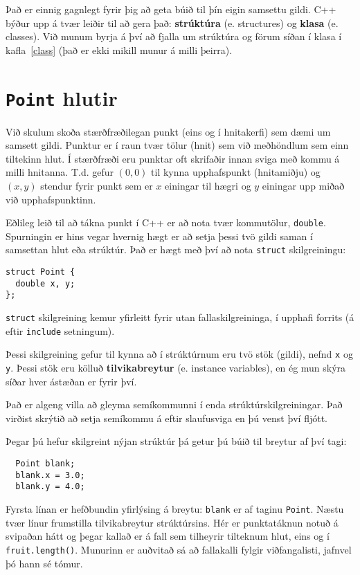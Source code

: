 Það er einnig gagnlegt fyrir þig að geta búið til þín eigin samsettu gildi.
C++ býður upp á tvær leiðir til að gera það: {\bf strúktúra} (e. structures) og {\bf klasa} (e. classes).
Við munum byrja á því að fjalla um strúktúra og förum síðan í klasa í kafla~\ref{class} (það er ekki mikill munur á milli þeirra).

\section{{\tt Point} hlutir}

Við skulum skoða stærðfræðilegan punkt (eins og í hnitakerfi) sem dæmi um samsett gildi.
Punktur er í raun tvær tölur (hnit) sem við meðhöndlum sem einn tiltekinn hlut.
Í stærðfræði eru punktar oft skrifaðir innan sviga með kommu á milli hnitanna.
T.d. gefur $(0, 0)$ til kynna upphafspunkt (hnitamiðju) og $(x, y)$ stendur fyrir punkt sem er $x$ einingar til hægri og $y$ einingar upp miðað við upphafspunktinn.

Eðlileg leið til að tákna punkt í C++ er að nota tvær kommutölur, {\tt double}.
Spurningin er hins vegar hvernig hægt er að setja þessi tvö gildi saman í samsettan hlut eða strúktúr.
Það er hægt með því að nota {\tt struct} skilgreiningu:

\begin{verbatim}
struct Point {
  double x, y;
};  
\end{verbatim}
%
{\tt struct} skilgreining kemur yfirleitt fyrir utan fallaskilgreininga, í upphafi forrits (á eftir {\tt include} setningum).

Þessi skilgreining gefur til kynna að í strúktúrnum eru tvö stök (gildi), nefnd {\tt x} og {\tt y}.
Þessi stök eru kölluð {\bf tilvikabreytur} (e. instance variables), en ég mun skýra síðar hver ástæðan er fyrir því.

Það er algeng villa að gleyma semíkommunni í enda strúktúrskilgreiningar.
Það virðist skrýtið að setja semíkommu á eftir slaufusviga en þú venst því fljótt.

Þegar þú hefur skilgreint nýjan strúktúr þá getur þú búið til breytur af því tagi:

\begin{verbatim}
  Point blank;
  blank.x = 3.0;
  blank.y = 4.0;   
\end{verbatim}
%
Fyrsta línan er hefðbundin yfirlýsing á breytu: {\tt blank} er af taginu {\tt Point}.
Næstu tvær línur frumstilla tilvikabreytur strúktúrsins.
Hér er punktatáknun notuð á svipaðan hátt og þegar kallað er á fall sem tilheyrir tilteknum hlut, eins og í {\tt fruit.length()}.
Munurinn er auðvitað sá að fallakalli fylgir viðfangalisti, jafnvel þó hann sé tómur.

